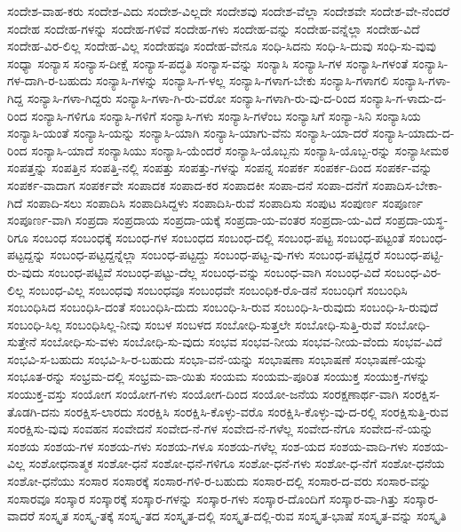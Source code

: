 {ಸಂದೇಶ-ವಾಹ-ಕರು
ಸಂದೇಶ-ವಿದು
ಸಂದೇಶ-ವಿಲ್ಲದೇ
ಸಂದೇಶವು
ಸಂದೇಶ-ವೆಲ್ಲಾ
ಸಂದೇಶವೇ
ಸಂದೇಶ-ವೇ-ನೆಂದರೆ
ಸಂದೇಹ
ಸಂದೇಹ-ಗಳನ್ನು
ಸಂದೇಹ-ಗಳಿವೆ
ಸಂದೇಹ-ಗಳು
ಸಂದೇಹ-ವನ್ನು
ಸಂದೇಹ-ವನ್ನೆಲ್ಲಾ
ಸಂದೇಹ-ವಿದೆ
ಸಂದೇಹ-ವಿರ-ಲಿಲ್ಲ
ಸಂದೇಹ-ವಿಲ್ಲ
ಸಂದೇಹವೂ
ಸಂದೇಹ-ವೇನೂ
ಸಂಧಿ-ಸಿದನು
ಸಂಧಿ-ಸಿ-ದುವು
ಸಂಧಿ-ಸು-ವುವು
ಸಂಧ್ಯಾ
ಸಂನ್ಯಾಸ
ಸಂನ್ಯಾಸ-ದೀಕ್ಷೆ
ಸಂನ್ಯಾಸ-ಪದ್ಧತಿ
ಸಂನ್ಯಾಸ-ವನ್ನು
ಸಂನ್ಯಾಸಿ
ಸಂನ್ಯಾಸಿ-ಗಳ
ಸಂನ್ಯಾಸಿ-ಗಳಂತೆ
ಸಂನ್ಯಾಸಿ-ಗಳ-ದಾಗಿ-ರ-ಬಹುದು
ಸಂನ್ಯಾಸಿ-ಗಳನ್ನು
ಸಂನ್ಯಾಸಿ-ಗ-ಳಲ್ಲ
ಸಂನ್ಯಾಸಿ-ಗಳಾಗ-ಬೇಕು
ಸಂನ್ಯಾಸಿ-ಗಳಾಗಲಿ
ಸಂನ್ಯಾಸಿ-ಗಳಾ-ಗಿದ್ದ
ಸಂನ್ಯಾಸಿ-ಗಳಾ-ಗಿದ್ದರು
ಸಂನ್ಯಾಸಿ-ಗಳಾ-ಗಿ-ರು-ವರೋ
ಸಂನ್ಯಾಸಿ-ಗಳಾಗಿ-ರು-ವು-ದ-ರಿಂದ
ಸಂನ್ಯಾಸಿ-ಗ-ಳಾದು-ದ-ರಿಂದ
ಸಂನ್ಯಾಸಿ-ಗಳಿಗೂ
ಸಂನ್ಯಾಸಿ-ಗಳಿಗೆ
ಸಂನ್ಯಾಸಿ-ಗಳು
ಸಂನ್ಯಾಸಿ-ಗಳೆಂಬ
ಸಂನ್ಯಾಸಿಗೆ
ಸಂನ್ಯಾ-ಸಿನಿ
ಸಂನ್ಯಾಸಿಯ
ಸಂನ್ಯಾಸಿ-ಯಂತೆ
ಸಂನ್ಯಾಸಿ-ಯನ್ನು
ಸಂನ್ಯಾಸಿ-ಯಾಗಿ
ಸಂನ್ಯಾಸಿ-ಯಾಗು-ವೆನು
ಸಂನ್ಯಾಸಿ-ಯಾ-ದರೆ
ಸಂನ್ಯಾಸಿ-ಯಾದು-ದ-ರಿಂದ
ಸಂನ್ಯಾಸಿ-ಯಾದೆ
ಸಂನ್ಯಾಸಿಯು
ಸಂನ್ಯಾಸಿ-ಯೆಂದರೆ
ಸಂನ್ಯಾಸಿ-ಯೊಬ್ಬನು
ಸಂನ್ಯಾಸಿ-ಯೊಬ್ಬ-ರನ್ನು
ಸಂನ್ಯಾಸೀಮಠ
ಸಂಪತ್ತನ್ನು
ಸಂಪತ್ತಿನ
ಸಂಪತ್ತಿ-ನಲ್ಲಿ
ಸಂಪತ್ತು
ಸಂಪತ್ತು-ಗಳನ್ನು
ಸಂಪನ್ನ
ಸಂಪರ್ಕ
ಸಂಪರ್ಕ-ದಿಂದ
ಸಂಪರ್ಕ-ವನ್ನು
ಸಂಪರ್ಕ-ವಾದಾಗ
ಸಂಪರ್ಕವೇ
ಸಂಪಾದಕ
ಸಂಪಾದ-ಕರ
ಸಂಪಾದಕೀ
ಸಂಪಾ-ದನೆ
ಸಂಪಾ-ದನೆಗೆ
ಸಂಪಾದಿಸ-ಬೇಕಾ-ಗಿದೆ
ಸಂಪಾದಿ-ಸಲು
ಸಂಪಾದಿಸಿ
ಸಂಪಾದಿಸಿದ್ದಳು
ಸಂಪಾದಿಸಿ-ರುವೆ
ಸಂಪಾದಿಸು
ಸಂಪುಟ
ಸಂಪುರ್ಣ
ಸಂಪೂರ್ಣ
ಸಂಪೂರ್ಣ-ವಾಗಿ
ಸಂಪ್ರದಾ
ಸಂಪ್ರದಾಯ
ಸಂಪ್ರದಾ-ಯಕ್ಕೆ
ಸಂಪ್ರದಾ-ಯ-ವಂತರ
ಸಂಪ್ರದಾ-ಯ-ವಿದೆ
ಸಂಪ್ರದಾ-ಯಸ್ಥ-ರಿಗೂ
ಸಂಬಂಧ
ಸಂಬಂಧಕ್ಕೆ
ಸಂಬಂಧ-ಗಳ
ಸಂಬಂಧದ
ಸಂಬಂಧ-ದಲ್ಲಿ
ಸಂಬಂಧ-ಪಟ್ಟ
ಸಂಬಂಧ-ಪಟ್ಟಂತೆ
ಸಂಬಂಧ-ಪಟ್ಟದ್ದನ್ನು
ಸಂಬಂಧ-ಪಟ್ಟದ್ದನ್ನೆಲ್ಲಾ
ಸಂಬಂಧ-ಪಟ್ಟದ್ದು
ಸಂಬಂಧ-ಪಟ್ಟ-ವು-ಗಳು
ಸಂಬಂಧ-ಪಟ್ಟಿದ್ದರೆ
ಸಂಬಂಧ-ಪಟ್ಟಿ-ರು-ವುದು
ಸಂಬಂಧ-ಪಟ್ಟಿವೆ
ಸಂಬಂಧ-ಪಟ್ಟು-ದೆಲ್ಲ
ಸಂಬಂಧ-ವನ್ನು
ಸಂಬಂಧ-ವಾಗಿ
ಸಂಬಂಧ-ವಿದೆ
ಸಂಬಂಧ-ವಿರ-ಲಿಲ್ಲ
ಸಂಬಂಧ-ವಿಲ್ಲ
ಸಂಬಂಧವು
ಸಂಬಂಧವೂ
ಸಂಬಂಧವೇ
ಸಂಬಂಧಿಕ-ರೊ-ಡನೆ
ಸಂಬಂಧಿಗೆ
ಸಂಬಂಧಿಸಿ
ಸಂಬಂಧಿಸಿದ
ಸಂಬಂಧಿಸಿ-ದಂತೆ
ಸಂಬಂಧಿಸಿ-ದುದು
ಸಂಬಂಧಿ-ಸಿ-ರುವ
ಸಂಬಂಧಿ-ಸಿ-ರುವುದು
ಸಂಬಂಧಿ-ಸಿ-ರುವುದೆ
ಸಂಬಂಧಿ-ಸಿಲ್ಲ
ಸಂಬಂಧಿಸಿಲ್ಲ-ನೀವು
ಸಂಬಳ
ಸಂಬಳದ
ಸಂಬೋಧಿ-ಸುತ್ತಲೇ
ಸಂಬೋಧಿ-ಸುತ್ತಿ-ರುವೆ
ಸಂಬೋಧಿ-ಸುತ್ತೇನೆ
ಸಂಬೋಧಿ-ಸು-ವಳು
ಸಂಬೋಧಿ-ಸು-ವುದು
ಸಂಭವ
ಸಂಭವ-ನೀಯ
ಸಂಭವ-ನೀಯ-ವೆಂದು
ಸಂಭವ-ವಿದೆ
ಸಂಭವಿ-ಸ-ಬಹುದು
ಸಂಭವಿ-ಸಿ-ರ-ಬಹುದು
ಸಂಭಾ-ವನೆ-ಯನ್ನು
ಸಂಭಾಷಣಾ
ಸಂಭಾಷಣೆ
ಸಂಭಾಷಣೆ-ಯನ್ನು
ಸಂಭೂತ-ರನ್ನು
ಸಂಭ್ರಮ-ದಲ್ಲಿ
ಸಂಭ್ರಮ-ವಾ-ಯಿತು
ಸಂಯಮ
ಸಂಯಮ-ಪೂರಿತ
ಸಂಯುಕ್ತ
ಸಂಯುಕ್ತ-ಗಳನ್ನು
ಸಂಯುಕ್ತ-ವಸ್ತು
ಸಂಯೋಗ
ಸಂಯೋಗ-ಗಳು
ಸಂಯೋಗ-ದಿಂದ
ಸಂಯೋ-ಜನೆಯ
ಸಂರಕ್ಷಣಾರ್ಥ-ವಾಗಿ
ಸಂರಕ್ಷಿಸ-ತೊಡಗಿ-ದನು
ಸಂರಕ್ಷಿಸ-ಲಾರದು
ಸಂರಕ್ಷಿಸಿ
ಸಂರಕ್ಷಿಸಿ-ಕೊಳ್ಳು-ವರೊ
ಸಂರಕ್ಷಿಸಿ-ಕೊಳ್ಳು-ವು-ದ-ರಲ್ಲಿ
ಸಂರಕ್ಷಿಸುತ್ತಿ-ರುವ
ಸಂರಕ್ಷಿಸು-ವುವು
ಸಂವಹನ
ಸಂವೇದನೆ
ಸಂವೇದ-ನೆ-ಗಳ
ಸಂವೇದ-ನೆ-ಗಳೆಲ್ಲ
ಸಂವೇದ-ನೆಗೂ
ಸಂವೇದ-ನೆ-ಯನ್ನು
ಸಂಶಯ
ಸಂಶಯ-ಗಳ
ಸಂಶಯ-ಗಳು
ಸಂಶಯ-ಗಳೂ
ಸಂಶಯ-ಗಳೆಲ್ಲ
ಸಂಶ-ಯದ
ಸಂಶಯ-ವಾದಿ-ಗಳು
ಸಂಶಯ-ವಿಲ್ಲ
ಸಂಶೋಧನಾತ್ಮಕ
ಸಂಶೋ-ಧನೆ
ಸಂಶೋ-ಧನೆ-ಗಳಿಗೂ
ಸಂಶೋ-ಧನೆ-ಗಳು
ಸಂಶೋ-ಧ-ನೆಗೆ
ಸಂಶೋ-ಧನೆಯ
ಸಂಶೋ-ಧನೆಯು
ಸಂಸಾರ
ಸಂಸಾರಕ್ಕೆ
ಸಂಸಾರ-ಗಳಿ-ರ-ಬಹುದು
ಸಂಸಾರ-ದಲ್ಲಿ
ಸಂಸಾರ-ದ-ವರು
ಸಂಸಾರ-ವನ್ನು
ಸಂಸಾರವೂ
ಸಂಸ್ಕಾರ
ಸಂಸ್ಕಾರಕ್ಕೆ
ಸಂಸ್ಕಾರ-ಗಳನ್ನು
ಸಂಸ್ಕಾರ-ಗಳು
ಸಂಸ್ಕಾರ-ದೊಂದಿಗೆ
ಸಂಸ್ಕಾರ-ವಾ-ಗಿತ್ತು
ಸಂಸ್ಕಾರ-ವಾದರೆ
ಸಂಸ್ಕೃತ
ಸಂಸ್ಕೃ-ತಕ್ಕೆ
ಸಂಸ್ಕೃ-ತದ
ಸಂಸ್ಕೃತ-ದಲ್ಲಿ
ಸಂಸ್ಕೃತ-ದಲ್ಲಿ-ರುವ
ಸಂಸ್ಕೃತ-ಭಾಷೆ
ಸಂಸ್ಕೃತ-ವನ್ನು
ಸಂಸ್ಕೃತಿ
}
